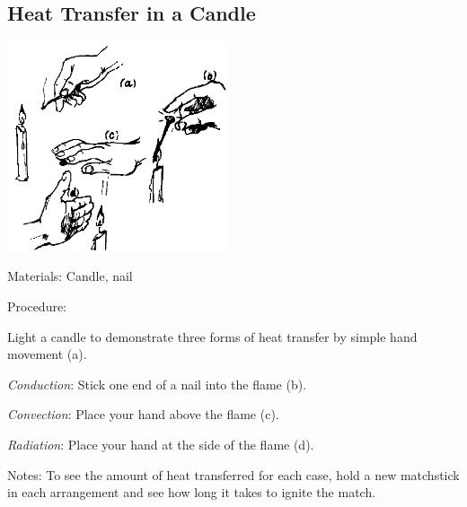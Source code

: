 \begin{multicols}{2}
\subsection{Heat Transfer in a Candle}

\begin{center}
\includegraphics[width=0.49\textwidth]{./img/source/heat-trans-candle.png}
\end{center}

\begin{description*}
\item[Materials:]{Candle, nail}
\item[Procedure:]{Light a candle to demonstrate three forms of heat transfer by simple hand movement (a). 

\emph{Conduction}: Stick one end of a nail into the flame (b). 

\emph{Convection}: Place your hand above the flame (c). 

\emph{Radiation}: Place your hand at the side of the flame (d).}
\item[Notes:]{To see the amount of heat transferred for each case, hold a new matchstick in each arrangement and see how long it takes to ignite the match.}
\end{description*}

\vfill
\columnbreak



\end{multicols}
